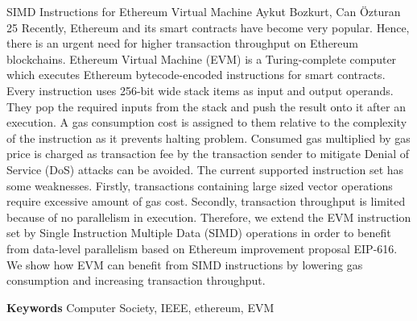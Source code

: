 
    \begin{abstract_online}{SIMD Instructions for Ethereum Virtual Machine}{%
        Aykut Bozkurt, Can Özturan}{%
        }{%
        25}
    Recently, Ethereum and its smart contracts have become very popular. Hence, there is an urgent need for higher transaction throughput on Ethereum blockchains. Ethereum Virtual Machine (EVM) is a Turing-complete computer which executes Ethereum bytecode-encoded instructions for smart contracts. Every instruction uses 256-bit wide stack items as input and output operands. They pop the required inputs from the stack and push the result onto it after an execution. A gas consumption cost is assigned to them relative to the complexity of the instruction as it prevents halting problem. Consumed gas multiplied by gas price is charged as transaction fee by the transaction sender to mitigate Denial of Service (DoS) attacks can be avoided. The current supported instruction set has some weaknesses. Firstly, transactions containing large sized vector operations require excessive amount of gas cost. Secondly, transaction throughput is limited because of no parallelism in execution. Therefore, we extend the EVM instruction set by Single Instruction Multiple Data (SIMD) operations in order to benefit from data-level parallelism based on Ethereum improvement proposal EIP-616. We show how EVM can benefit from SIMD instructions by lowering gas consumption and increasing transaction throughput. 
    
        \textbf{Keywords} \newline{}Computer Society, IEEE, ethereum, EVM
    \end{abstract_online}
    